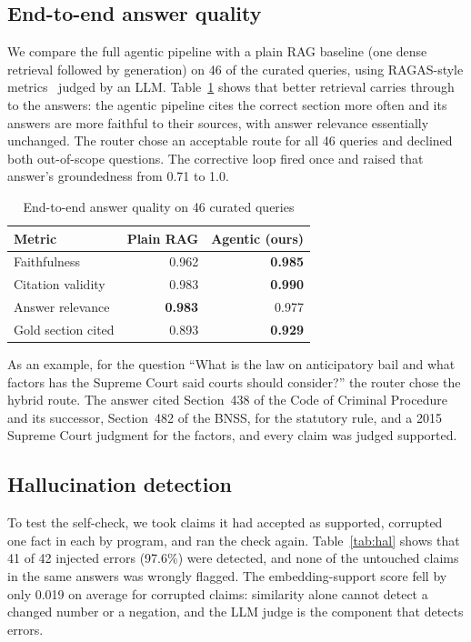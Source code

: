 \documentclass[conference]{IEEEtran}
\begin{document}
\subsection{End-to-end answer quality}
We compare the full agentic pipeline with a plain RAG baseline (one dense retrieval followed by generation) on 46 of the curated queries, using RAGAS-style metrics~\cite{es2023} judged by an LLM. Table~\ref{tab:rag} shows that better retrieval carries through to the answers: the agentic pipeline cites the correct section more often and its answers are more faithful to their sources, with answer relevance essentially unchanged. The router chose an acceptable route for all 46 queries and declined both out-of-scope questions. The corrective loop fired once and raised that answer's groundedness from 0.71 to 1.0.

\begin{table}[t]
\caption{End-to-end answer quality on 46 curated queries}
\label{tab:rag}
\centering
\begin{tabular}{@{}lrr@{}}
\toprule
Metric & Plain RAG & Agentic (ours) \\
\midrule
Faithfulness & 0.962 & \textbf{0.985} \\
Citation validity & 0.983 & \textbf{0.990} \\
Answer relevance & \textbf{0.983} & 0.977 \\
Gold section cited & 0.893 & \textbf{0.929} \\
\bottomrule
\end{tabular}
\end{table}

As an example, for the question ``What is the law on anticipatory bail and what factors has the Supreme Court said courts should consider?'' the router chose the hybrid route. The answer cited Section~438 of the Code of Criminal Procedure and its successor, Section~482 of the BNSS, for the statutory rule, and a 2015 Supreme Court judgment for the factors, and every claim was judged supported.

\subsection{Hallucination detection}
To test the self-check, we took claims it had accepted as supported, corrupted one fact in each by program, and ran the check again. Table~\ref{tab:hal} shows that 41 of 42 injected errors (97.6\%) were detected, and none of the untouched claims in the same answers was wrongly flagged. The embedding-support score fell by only 0.019 on average for corrupted claims: similarity alone cannot detect a changed number or a negation, and the LLM judge is the component that detects errors.
\end{document}
